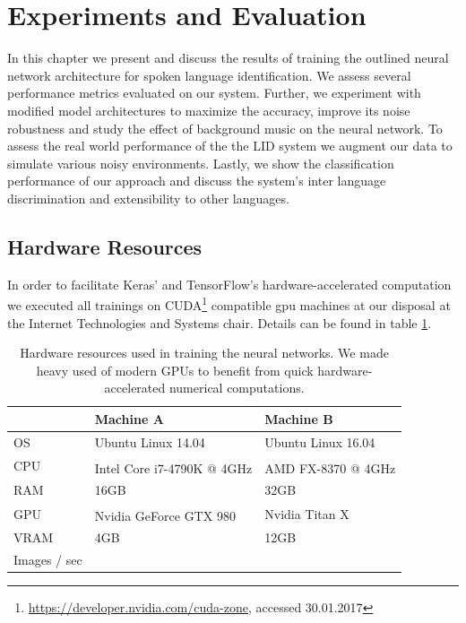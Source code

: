 \section{Experiments and Evaluation} 
\label{sec:evaluation}
In this chapter we present and discuss the results of training the outlined neural network architecture for spoken language identification. We assess several performance metrics evaluated on our system.
Further, we experiment with modified model architectures to maximize the accuracy, improve its noise robustness and study the effect of background music on the neural network. To assess the real world performance of the the LID system we augment our data to simulate various noisy environments. Lastly, we show the classification performance of our approach and discuss the system's inter language discrimination and extensibility to other languages.     

\subsection{Hardware Resources}
\label{sec:hardware}
	In order to facilitate Keras' and TensorFlow's hardware-accelerated computation we executed all trainings on CUDA\footnote{\url{https://developer.nvidia.com/cuda-zone}, accessed 30.01.2017} compatible \ac{gpu} machines at our disposal at the Internet Technologies and Systems chair. Details can be found in table \ref{tab:hardware}.
		
	\begin{table}[h]
	\centering
	\begin{tabularx}{\textwidth}{lll}
	\toprule
	  		& Machine A 					& Machine B \\ \midrule
	OS  	& Ubuntu Linux 14.04 		& Ubuntu Linux 16.04 \\
	CPU  	& Intel\textsuperscript{\textregistered} Core\textsuperscript{\texttrademark} i7-4790K @ 4GHz 	& AMD FX\textsuperscript{\texttrademark}-8370  @ 4GHz \\
	RAM  	& 16GB 						& 32GB \\
	GPU  	& Nvidia GeForce\textsuperscript{\textregistered} GTX 980 	& Nvidia Titan X \\
	VRAM  	& 4GB 						& 12GB \\
	Images / sec &				& \\
	\bottomrule
	\end{tabularx}
	\caption{Hardware resources used in training the neural networks. We made heavy used of modern GPUs to benefit from quick hardware-accelerated numerical computations.}
	\label{tab:hardware}
	\end{table}

